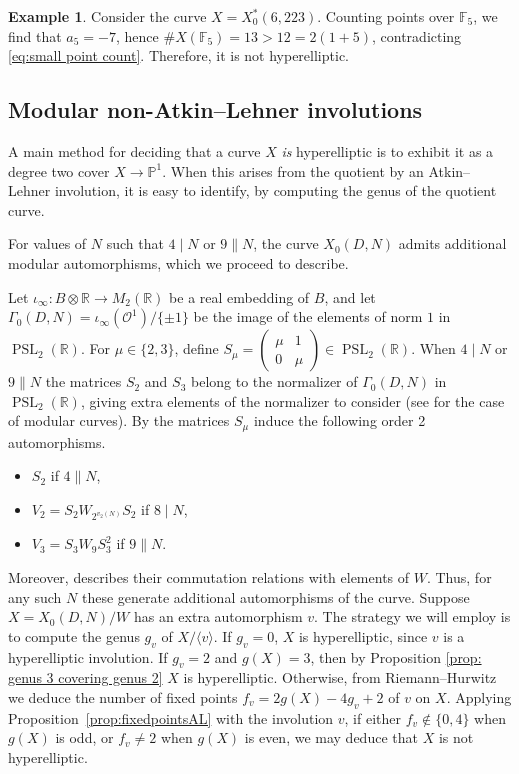 \documentclass[12pt]{amsart}
\newcommand{\F}{\mathbb{F}}
\renewcommand{\P}{\mathbb{P}}
\newcommand{\R}{\mathbb{R}}
\newcommand{\calO}{\mathcal{O}}
\newcommand{\PSL}{\operatorname{PSL}}
\numberwithin{equation}{subsection}
\theoremstyle{plain}\newtheorem{ithm}{Theorem}
\theoremstyle{plain}\newtheorem{iprop}[ithm]{Proposition}
\theoremstyle{definition}
\newtheorem{example}[equation]{Example}
\theoremstyle{remark}
\newcommand{\Order}{\calO} %
\newcommand{\Curve}[2]{X_0({#1},{#2})} %
\newcommand{\StarCurve}[2]{X_0^*({#1},{#2})} %
\begin{document}
\begin{example}
    Consider the curve $X = \StarCurve{6}{223}$. Counting points over $\F_5$, we find that $a_5 = -7$, hence $\# X(\F_5) = 13 > 12 = 2(1+5)$, contradicting \eqref{eq:small point count}. Therefore, it is not hyperelliptic. 
\end{example}

\subsection{Modular non-Atkin--Lehner involutions}
\label{sec:modularnonAL}
A main method for deciding that a curve $X$ \emph{is} hyperelliptic is to exhibit it as a degree two cover $X \to \P^1$.
When this arises from the quotient by an Atkin--Lehner involution, it is easy to identify, by computing the genus of the quotient curve.

For values of $N$ such that $4 \mid N$ or $9 \parallel N$, the curve $\Curve{D}{N}$ admits additional modular automorphisms, which we proceed to describe. 

Let $\iota_{\infty} : B \otimes \R \to M_2(\R)$ be a real embedding of $B$, and let $\Gamma_0(D,N) = \iota_{\infty}(\Order^1) / \{ \pm 1 \}$ be the image of the elements of norm $1$ in $\PSL_2(\R)$. 
For $\mu \in \{2, 3\}$, define $S_\mu = \begin{pmatrix} \mu & 1 \\ 0 & \mu \end{pmatrix} \in \PSL_2(\R)$.
When $4 \mid N$ or $9 \parallel N$ the matrices $S_2$ and $S_3$ belong to the normalizer of $\Gamma_0(D,N)$ in $\PSL_2(\R)$, giving extra elements of the normalizer to consider (see  \cite[Section 2]{FH99} for the case of modular curves).
By \cite[Lemma 1]{FH99} the matrices $S_{\mu}$ induce the following order 2 automorphisms.
\begin{itemize}
\item $S_2$ if $4 \parallel N$,
\item $V_2 = S_2 W_{2^{v_2(N)}} S_2$ if $8 \mid N$,
\item $V_3 = S_3 W_9 S_3^2$  if $9 \parallel N$.
\end{itemize}

Moreover, \cite[Lemma 1]{FH99} describes their commutation relations with elements of $W$. Thus, for any such $N$ these generate additional automorphisms of the curve. 
Suppose $X = \Curve{D}{N}/W$ has an extra automorphism $v$. The strategy we will employ is to compute the genus $g_v$ of $X / \langle v \rangle$. 
If $g_v = 0$, $X$ is hyperelliptic, since $v$ is a hyperelliptic involution. 
If $g_v = 2$ and $g(X) = 3$, then by Proposition \ref{prop: genus 3 covering genus 2} $X$ is hyperelliptic.
Otherwise, from Riemann--Hurwitz we deduce the number of fixed points $f_v = 2g(X) - 4g_v + 2$ of $v$ on $X$. Applying Proposition~\ref{prop:fixedpointsAL} with the involution $v$, if either $f_v \notin \{0, 4\}$ when $g(X)$ is odd, or $f_v \ne 2$ when $g(X)$ is even, we may deduce that $X$ is not hyperelliptic.
\end{document}
